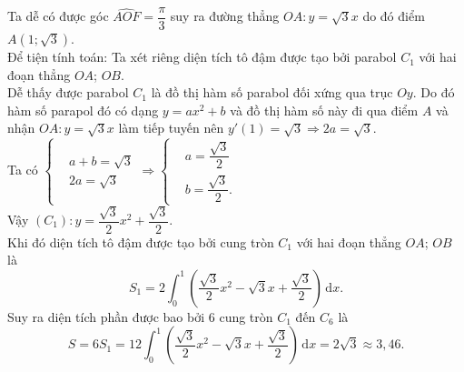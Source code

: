 \begin{bt}
{\begin{center}
	\end{center}
	Ta dễ có được góc $\widehat{AOF}=\dfrac{\pi}{3}$ suy ra đường thẳng $OA\colon y=\sqrt{3}x$ do đó  điểm $A(1;\sqrt{3})$.\\
	Để tiện tính toán:  Ta xét riêng diện tích tô đậm được tạo bởi parabol $C_1$ với hai đoạn thẳng $OA$; $OB$.\\
	Dễ thấy được parabol $C_1$ là đồ thị hàm số parabol đối xứng qua trục $Oy$.  Do đó hàm số parapol đó có dạng $y=ax^2+b$ và đồ thị hàm số này đi qua điểm $A$ và nhận $OA\colon y=\sqrt3x$ làm tiếp tuyến nên $y'(1)=\sqrt3\Rightarrow 2a=\sqrt3$.\\
	Ta có $\left\{\begin{aligned}
	&a+b=\sqrt{3} \\ 
	 &2a=\sqrt{3}
	\end{aligned}
	\Rightarrow \left\{\begin{aligned}
	&a=\dfrac{\sqrt{3}}{2}  \\
	 & b=\dfrac{\sqrt{3}}{2}.
	\end{aligned}
	\right.\right.$ \\ 
	Vậy  $\left(C_1\right)\colon y=\dfrac{\sqrt{3}}{2}x^2+\dfrac{\sqrt{3}}{2}$.\\
	Khi đó diện tích tô đậm được tạo bởi cung tròn $C_1$ với hai đoạn  thẳng $OA$; $OB$ là\\
	\[S_1=2\displaystyle\int^1_0\left(\dfrac{\sqrt{3}}{2}x^2-\sqrt{3}x+\dfrac{\sqrt{3}}{2}\right)\, \mathrm{d}x. 
	\] 
	Suy ra diện tích  phần được bao bởi $6$ cung tròn $C_1$ đến $C_6$ là\\
	\[S=6S_1=12\displaystyle\int^1_0\left(\dfrac{\sqrt{3}}{2}x^2-\sqrt{3}x+\dfrac{\sqrt{3}}{2}\right)\,\mathrm{d}x=2\sqrt{3}\approx  3{,}46.
	\] 
	} 
\end{bt}

